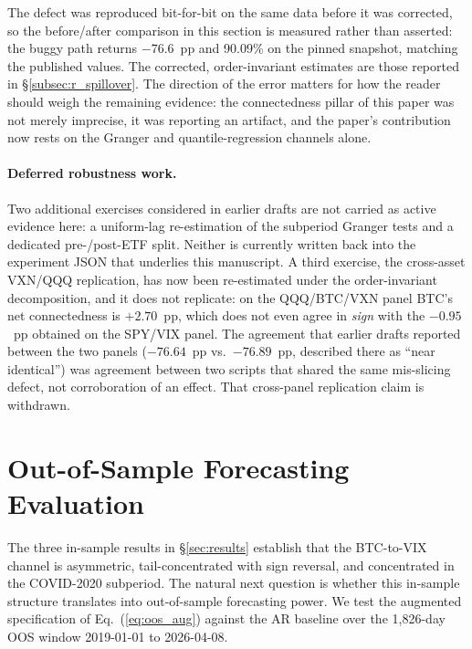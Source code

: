 \documentclass[11pt,a4paper]{article}
\begin{document}
The defect was reproduced bit-for-bit on the same data before it was corrected, so the before/after comparison in this section is measured rather than asserted: the buggy path returns $-76.6$~pp and 90.09\% on the pinned snapshot, matching the published values. The corrected, order-invariant estimates are those reported in \S\ref{subsec:r_spillover}. The direction of the error matters for how the reader should weigh the remaining evidence: the connectedness pillar of this paper was not merely imprecise, it was reporting an artifact, and the paper's contribution now rests on the Granger and quantile-regression channels alone.

\paragraph{Deferred robustness work.} Two additional exercises considered in earlier drafts are not carried as active evidence here: a uniform-lag re-estimation of the subperiod Granger tests and a dedicated pre-/post-ETF split. Neither is currently written back into the experiment JSON that underlies this manuscript. A third exercise, the cross-asset VXN/QQQ replication, has now been re-estimated under the order-invariant decomposition, and it does not replicate: on the QQQ/BTC/VXN panel BTC's net connectedness is $+2.70$~pp, which does not even agree in \emph{sign} with the $-0.95$~pp obtained on the SPY/VIX panel.%
 The agreement that earlier drafts reported between the two panels ($-76.64$~pp vs.\ $-76.89$~pp, described there as ``near identical'') was agreement between two scripts that shared the same mis-slicing defect, not corroboration of an effect. That cross-panel replication claim is withdrawn.

\section{Out-of-Sample Forecasting Evaluation}
\label{sec:oos}

The three in-sample results in \S\ref{sec:results} establish that the BTC-to-VIX channel is asymmetric, tail-concentrated with sign reversal, and concentrated in the COVID-2020 subperiod. The natural next question is whether this in-sample structure translates into out-of-sample forecasting power. We test the augmented specification of Eq.~(\ref{eq:oos_aug}) against the AR baseline over the 1{,}826-day OOS window 2019-01-01 to 2026-04-08.
\end{document}
